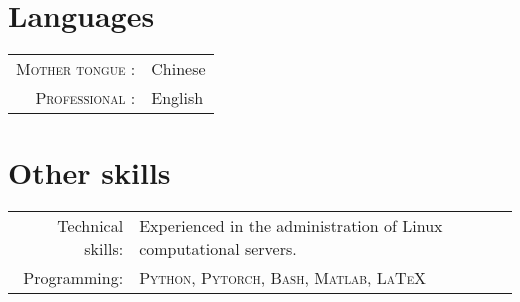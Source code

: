 \documentclass[a4paper,10pt]{article}
\begin{document}





\vspace{-10pt}

\section{Languages}

\begin{tabular}{rp{10cm}}

  \textsc{Mother tongue :} & Chinese \\

  \textsc{Professional :} & English \\

\end{tabular}


\section{Other skills}

\begin{tabular}{rp{12cm}}
	Technical skills:  & Experienced in the administration of Linux computational servers.
                       \vspace{5pt}\\
	Programming:       & \textsc{Python, Pytorch, Bash, Matlab, \LaTeX}  \vspace{5pt}\\
\end{tabular}
\end{document}
